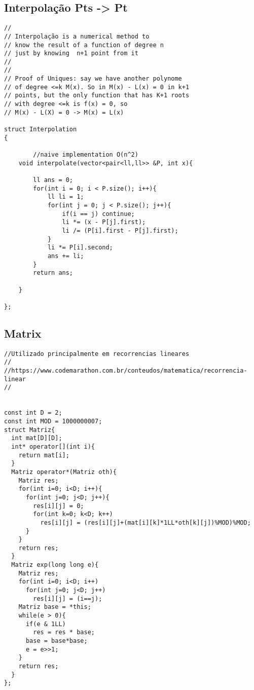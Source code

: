 \documentclass[11pt, a4paper, twoside]{article}
\begin{document}
\subsection{Interpolação Pts -> Pt}
\begin{verbatim}
// 
// Interpolação is a numerical method to 
// know the result of a function of degree n 
// just by knowing  n+1 point from it
//
//
// Proof of Uniques: say we have another polynome
// of degree <=k M(x). So in M(x) - L(x) = 0 in k+1
// points, but the only function that has K+1 roots
// with degree <=k is f(x) = 0, so
// M(x) - L(X) = 0 -> M(x) = L(x)

struct Interpolation
{
        
        //naive implementation O(n^2)
    void interpolate(vector<pair<ll,ll>> &P, int x){
    
        ll ans = 0;
        for(int i = 0; i < P.size(); i++){
            ll li = 1;
            for(int j = 0; j < P.size(); j++){
                if(i == j) continue;
                li *= (x - P[j].first);
                li /= (P[i].first - P[j].first);
            }
            li *= P[i].second;
            ans += li;
        }
        return ans;
    
    }
    
};
\end{verbatim}

\subsection{Matrix}
\begin{verbatim}
//Utilizado principalmente em recorrencias lineares
//
//https://www.codemarathon.com.br/conteudos/matematica/recorrencia-linear
//


const int D = 2;
const int MOD = 1000000007;
struct Matriz{
  int mat[D][D];
  int* operator[](int i){
    return mat[i];
  }
  Matriz operator*(Matriz oth){
    Matriz res;
    for(int i=0; i<D; i++){
      for(int j=0; j<D; j++){
        res[i][j] = 0;
        for(int k=0; k<D; k++)
          res[i][j] = (res[i][j]+(mat[i][k]*1LL*oth[k][j])%MOD)%MOD;
      }
    }
    return res;
  }
  Matriz exp(long long e){
    Matriz res;
    for(int i=0; i<D; i++)
      for(int j=0; j<D; j++)
        res[i][j] = (i==j);    
    Matriz base = *this;  
    while(e > 0){
      if(e & 1LL)
        res = res * base;
      base = base*base;
      e = e>>1;
    }
    return res;
  }
};
\end{verbatim}
\end{document}
